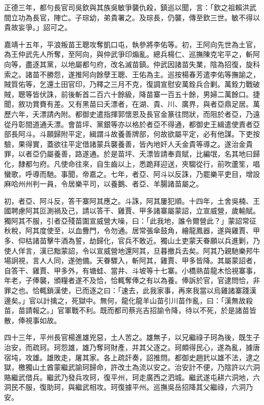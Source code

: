 \begin{pinyinscope}
正德三年，都勻長官司吳欽與其族吳敏爭襲仇殺，鎮巡以聞，言：「欽之祖賴洪武間立功為長官，陣亡。子琮幼，弟貴署之。及琮長，仍襲，傳至欽三世。敏不得以貴故妄爭。」詔可之。

嘉靖十五年，平浪叛苗王聰攻奪凱口屯，執參將李佑等。初，王阿向先世為土官，為王仲武先人所奪，至阿向，與仲武爭印煽亂。總兵楊仁、巡撫陳克宅平之，斬阿向等，盡逐其黨，以地屬都勻府，改名滅苗鎮。仲武因諸苗失業，陰為招復，旋科索之。諸苗不勝怨，遂推阿向餘孽王聰、王佑為主。巡按楊春芳遣李佑等撫諭之，賊質佑等，乞還土田官印，乃釋之三月不克，復調宣慰安萬銓兵合剿。萬銓力戰破賊，聰等皆伏誅，前後斬首二百六十餘級，降苗寨一百五十餘，男婦二萬餘口。捷聞，敘功賞賚有差。又有黑苗曰夭漂者，在湖、貴、川、廣界，與者亞鼎足居。萬歷六年，夭漂請內附。都御史遣指揮郭懷恩及長官金篆往問狀，而阻於者亞，乃遠從丹彰間道通夭漂。會苗坪、黨銀等亦以格於者亞不得通，都御史王緝遣使責者亞部長阿斗。斗願歸附平定，緝謂斗故養善牌部，何故欲屬平定，必有他謀。下吏按驗，果得實，蓋欲往平定借諸蒙兵襲養善，皆內地奸人夭金貴等導之。遂治金貴罪，以者亞仍屬養善，路遂通。於是苗坪、夭漂皆請奉貢賦，比編氓，名其地曰歸化，隸都勻府。凡使命往來，自生齒以上，悉跪拜迎送，夾騶從行，前吹蘆笙，唱蠻歌，呼導而馳。事聞，帝嘉之。七年，者亞、阿斗以反誅，乃罷樂平吏目，增設麻哈州州判一員，令居樂平司，以養鵝、者亞、羊腸諸苗屬之。

初，者亞、阿斗反，答干寨阿其應之。斗誅，阿其屢犯順。十四年，土舍吳楠、王國聘慮阿其叵測禍及己，請以答干、雞賈、甲多諸寨屬蒙詔，立宣威營，歲輸賦。獨阿其不服，引者亞殘苗圍宣威營大噪，曰：「此我地，誰令爾營此？」蒙詔常征秋稅，阿其度使至，以血釁門，令勿通。居常張傘鼓角，繪龍鳳器，遂與雞賈、甲多、仰枯諸苗擊牛酒為誓，劫歸化，官兵不敢近。獨山土吏蒙天眷願以兵進剿，乃使人佯言，漢已黜蒙詔，令以宣威營地還阿其，旦暮撤兵去矣。阿其乃親馳樂邦牛場詗視，言人人同，遂弛備。天眷驟入，斬阿其，雞賈、甲多皆降。其屬蒙詔者，自答干、雞賈、甲多外，有塘蛙、當井、斗坡等十七寨。小橋熟苗龍木恰視寨事，年老，子俸襲，頒糧者遂不及恰，恰輒奪俸之有以為養。俸訴於官，官逮問恰，非罪之也。恰輒鎖漢使，已而逐之曰：「速去，此我家事，再來我當以烏雞諸寨踐漢邊矣。」官以計擒之，死獄中。無何，龍化龍羊山苗引川苗作亂，曰：「漢無故殺苗，苗請報之。」官軍戰不利。既而都司蔡兆吉招諭令降，待以不死，於是諸苗皆散，俸視事如故。

四十三年，平州長官楊進雄兇惡，土人苦之。雄無子，以兄繼祿子珂為後，既生子治安，而疏珂。珂怨雄，雄乃奪珂財產，并其父逐之。珂頗得民心，遂為亂，據唐宿坉，攻雄。雄敗走，屠其家。各上疏訐奏，詔推問。都御史趙釴以雄不法，逮之獄，檄獨山土酋蒙繼武諭珂歸命，許改土為流以安之。治安計不便，乃陰許以六洞賂繼武借兵。繼武乃發兵攻珂，復平州，珂走廣西之泗城。繼武遂屯耕六洞地，六洞民不服，復助珂，與繼武相攻。珂復據平州。巡撫吳岳招降其父繼祿，六洞乃安。


\end{pinyinscope}
